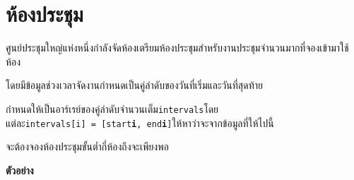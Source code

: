 \documentclass{article}
\begin{document}
\section*{ห้องประชุม}

ศูนย์ประชุมใหญ่แห่งหนึ่งกำลังจัดห้องเตรียมห้องประชุมสำหรับงานประชุมจำนวนมากที่จองเข้ามาใช้ห้อง

โดยมีข้อมูลช่วงเวลาจัดงานกำหนดเป็นคู่ลำดับของวันที่เริ่มและวันที่สุดท้าย

กำหนดให้เป็นอาร์เรย์ของคู่ลำดับจำนวนเต็ม\texttt{intervals}โดยแต่ละ\texttt{intervals{[}i{]}\ =\ {[}start}\textbf{\texttt{i}}\texttt{,\ end}\textbf{\texttt{i}}\texttt{{]}}ให้หาว่าจะจากข้อมูลที่ให้ไปนี้

จะต้องจองห้องประชุมขั้นต่ำกี่ห้องถึงจะเพียงพอ\\



\hfill\break



\textbf{ตัวอย่าง}
\end{document}
